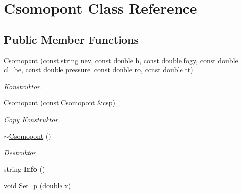 \hypertarget{class_csomopont}{}\section{Csomopont Class Reference}
\label{class_csomopont}
\subsection*{Public Member Functions}
\begin{DoxyCompactItemize}
\item 
\hyperlink{class_csomopont_af04abc9d2970dd817ff15cb675925635}{Csomopont} (const string nev, const double h, const double fogy, const double cl\+\_\+be, const double pressure, const double ro, const double tt)\hypertarget{class_csomopont_af04abc9d2970dd817ff15cb675925635}{}\label{class_csomopont_af04abc9d2970dd817ff15cb675925635}

\begin{DoxyCompactList}\small\item\em Konstruktor. \end{DoxyCompactList}\item 
\hyperlink{class_csomopont_ab75df66e91e91f104d743c821ca58acf}{Csomopont} (const \hyperlink{class_csomopont}{Csomopont} \&csp)\hypertarget{class_csomopont_ab75df66e91e91f104d743c821ca58acf}{}\label{class_csomopont_ab75df66e91e91f104d743c821ca58acf}

\begin{DoxyCompactList}\small\item\em Copy Konstruktor. \end{DoxyCompactList}\item 
\hyperlink{class_csomopont_a54cde5164ba96dc2898d345ebae8dc95}{$\sim$\+Csomopont} ()\hypertarget{class_csomopont_a54cde5164ba96dc2898d345ebae8dc95}{}\label{class_csomopont_a54cde5164ba96dc2898d345ebae8dc95}

\begin{DoxyCompactList}\small\item\em Destruktor. \end{DoxyCompactList}\item 
string {\bfseries Info} ()\hypertarget{class_csomopont_a2f90b4f53a8f37b542b8e65be9d2bed9}{}\label{class_csomopont_a2f90b4f53a8f37b542b8e65be9d2bed9}

\item 
void \hyperlink{class_csomopont_a77f11475136286565a249513a7312206}{Set\+\_\+p} (double x)\hypertarget{class_csomopont_a77f11475136286565a249513a7312206}{}\label{class_csomopont_a77f11475136286565a249513a7312206}


\end{DoxyCompactItemize}
